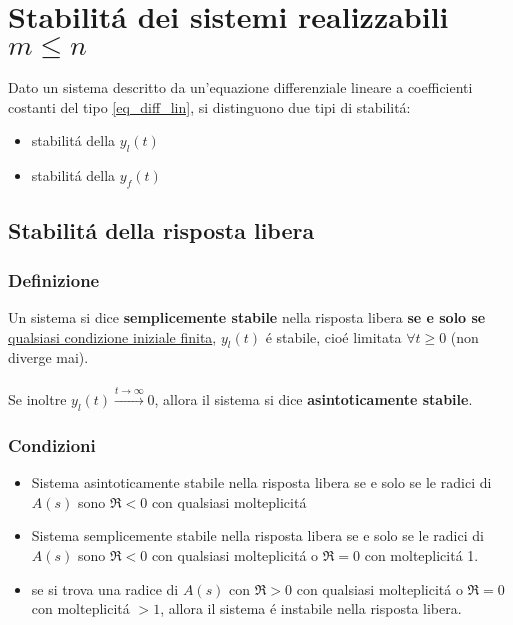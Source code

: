 \documentclass[../main.tex]{subfiles}
\begin{document}
	\section{Stabilit\'{a} dei sistemi realizzabili $ m \leq n $}
	Dato un sistema descritto da un'equazione differenziale lineare a coefficienti costanti del tipo \ref{eq_diff_lin}, si distinguono due tipi di stabilit\'{a}:
	\begin{itemize}
		\item stabilit\'{a} della $ y_l(t) $
		\item stabilit\'{a} della $ y_f(t) $
	\end{itemize}
	\subsection{Stabilit\'{a} della risposta libera}
	\subsubsection{Definizione}
	Un sistema si dice \textbf{semplicemente stabile} nella risposta libera \textbf{se e solo se} \underline{qualsiasi condizione iniziale finita}, $ y_l(t) $ \'{e} stabile, cio\'{e} limitata $ \forall t \geq 0 $ (non diverge mai).\\
	\smallskip\\
	Se inoltre $ y_l(t) \stackrel{t \to \infty}{\longrightarrow} 0 $, allora il sistema si dice \textbf{asintoticamente stabile}.
	\subsubsection{Condizioni}
	\begin{itemize}
		\item Sistema asintoticamente stabile nella risposta libera se e solo se le radici di $ A(s) $ sono $ \Re < 0 $ con qualsiasi molteplicit\'{a}
		\item Sistema semplicemente stabile nella risposta libera se e solo se le radici di $ A(s) $ sono $ \Re < 0 $ con qualsiasi molteplicit\'{a} o $ \Re = 0 $ con molteplicit\'{a} 1.
		\item se si trova una radice di $ A(s) $ con $ \Re > 0 $ con qualsiasi molteplicit\'{a} o $ \Re = 0 $ con molteplicit\'{a} $ >1 $, allora il sistema \'{e} instabile nella risposta libera.
	\end{itemize}
\end{document}
